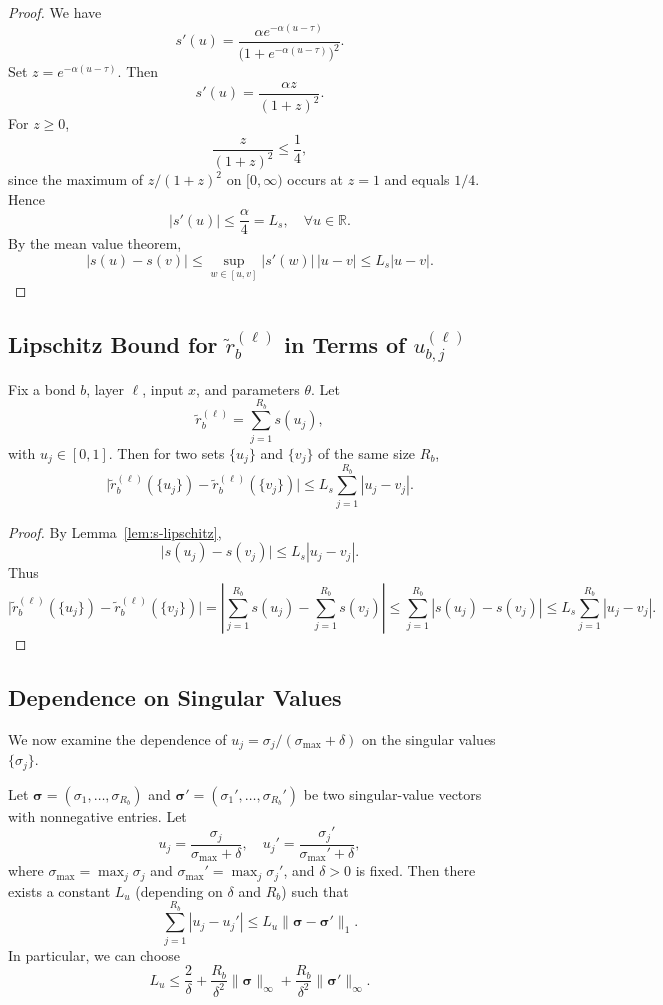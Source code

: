 \documentclass[11pt]{article}
\begin{document}
\begin{proof}
We have
\[
s'(u) = \frac{\alpha e^{-\alpha(u-\tau)}}{\big(1 + e^{-\alpha(u-\tau)}\big)^2}.
\]
Set $z = e^{-\alpha(u-\tau)}$. Then
\[
s'(u) = \frac{\alpha z}{(1+z)^2}.
\]
For $z\ge 0$,
\[
\frac{z}{(1+z)^2} \le \frac{1}{4},
\]
since the maximum of $z/(1+z)^2$ on $[0,\infty)$ occurs at $z=1$ and equals $1/4$. Hence
\[
|s'(u)| \le \frac{\alpha}{4} = L_s, \quad \forall u\in\mathbb{R}.
\]
By the mean value theorem,
\[
|s(u) - s(v)| \le \sup_{w\in[u,v]} |s'(w)|\,|u-v|
\le L_s |u-v|.
\]
\end{proof}

\subsection{Lipschitz Bound for $\tilde{r}_b^{(\ell)}$ in Terms of $u_{b,j}^{(\ell)}$}

\begin{lemma}
\label{lem:rank-lipschitz-u}
Fix a bond $b$, layer $\ell$, input $x$, and parameters $\theta$. Let
\[
\tilde{r}_b^{(\ell)} = \sum_{j=1}^{R_b} s(u_j),
\]
with $u_j \in [0,1]$. Then for two sets $\{u_j\}$ and $\{v_j\}$ of the same size $R_b$,
\[
\big|\tilde{r}_b^{(\ell)}(\{u_j\}) - \tilde{r}_b^{(\ell)}(\{v_j\})\big|
\le L_s \sum_{j=1}^{R_b} |u_j - v_j|.
\]
\end{lemma}

\begin{proof}
By Lemma~\ref{lem:s-lipschitz},
\[
\big|s(u_j) - s(v_j)\big| \le L_s |u_j - v_j|.
\]
Thus
\[
\big|\tilde{r}_b^{(\ell)}(\{u_j\}) - \tilde{r}_b^{(\ell)}(\{v_j\})\big|
= \left|\sum_{j=1}^{R_b} s(u_j) - \sum_{j=1}^{R_b} s(v_j)\right|
\le \sum_{j=1}^{R_b} |s(u_j) - s(v_j)|
\le L_s \sum_{j=1}^{R_b} |u_j - v_j|.
\]
\end{proof}

\subsection{Dependence on Singular Values}

We now examine the dependence of $u_j = \sigma_j / (\sigma_{\max} + \delta)$ on the singular values $\{\sigma_j\}$.

\begin{lemma}
\label{lem:u-lipschitz}
Let $\bm{\sigma} = (\sigma_1,\dots,\sigma_{R_b})$ and $\bm{\sigma}' = (\sigma_1',\dots,\sigma_{R_b}')$ be two singular-value vectors with nonnegative entries. Let
\[
u_j = \frac{\sigma_j}{\sigma_{\max} + \delta}, \quad
u_j' = \frac{\sigma_j'}{\sigma_{\max}' + \delta},
\]
where $\sigma_{\max} = \max_j \sigma_j$ and $\sigma_{\max}' = \max_j \sigma_j'$, and $\delta > 0$ is fixed. Then there exists a constant $L_u$ (depending on $\delta$ and $R_b$) such that
\[
\sum_{j=1}^{R_b} |u_j - u_j'|
\le L_u \|\bm{\sigma} - \bm{\sigma}'\|_1.
\]
In particular, we can choose
\[
L_u \le \frac{2}{\delta} + \frac{R_b}{\delta^2}\|\bm{\sigma}\|_\infty + \frac{R_b}{\delta^2}\|\bm{\sigma}'\|_\infty.
\]
\end{lemma}
\end{document}

